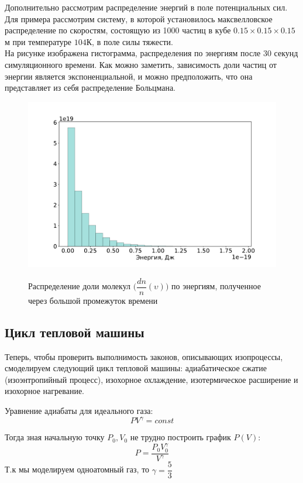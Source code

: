 \documentclass[twoside,twocolumn, 11pt]{article}
\theoremstyle{plain}
\theoremstyle{definition}
\begin{document}
Дополнительно рассмотрим распределение энергий в поле потенциальных сил. Для примера рассмотрим систему, в которой установилось максвелловское распределение по скоростям, состоящую из 1000 частиц в кубе $0.15 \times 0.15 \times 0.15$м при температуре $104$К, в поле силы тяжести.\\
\indent На рисунке изображена гистограмма, распределения по энергиям после 30 секунд симуляционного времени. Как можно заметить, зависимость доли частиц от энергии является экспоненциальной, и можно предположить, что она представляет из себя распределение Больцмана.

\begin{figure}[!h]
{\includegraphics[width=1\linewidth]{hist_E}}
\caption{Распределение доли молекул $\Big(\dfrac{dn}{n} (\upsilon) \Big)$ по энергиям, полученное через большой промежуток времени}
\end{figure}

\subsection{Цикл тепловой машины}
Теперь, чтобы проверить выполнимость законов, описывающих изопроцессы, смоделируем следующий цикл тепловой машины:
адиабатическое сжатие (изоэнтропийный процесс), изохорное охлаждение, изотермическое расширение и изохорное нагревание.

Уравнение адиабаты для идеального газа:
\[PV^\gamma = const \]

Тогда зная начальную точку $P_0, V_0$ не трудно построить график $P(V)$:
\[P = \dfrac{P_0 V_0^\gamma}{V ^\gamma} \]
Т.к мы моделируем одноатомный газ, то $\gamma = \dfrac{5}{3}$
\end{document}

